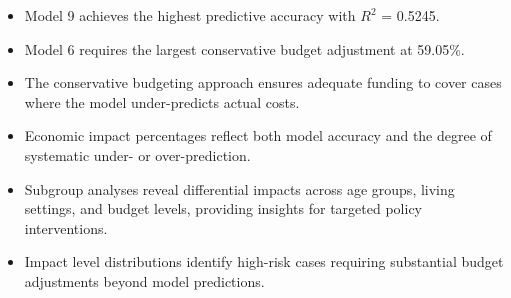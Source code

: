 \begin{itemize}
\item Model 9 achieves the highest predictive accuracy with $R^2$ = 0.5245.
\item Model 6 requires the largest conservative budget adjustment at 59.05\%.
\item The conservative budgeting approach ensures adequate funding to cover cases where the model under-predicts actual costs.
\item Economic impact percentages reflect both model accuracy and the degree of systematic under- or over-prediction.
\item Subgroup analyses reveal differential impacts across age groups, living settings, and budget levels, providing insights for targeted policy interventions.
\item Impact level distributions identify high-risk cases requiring substantial budget adjustments beyond model predictions.
\end{itemize}

